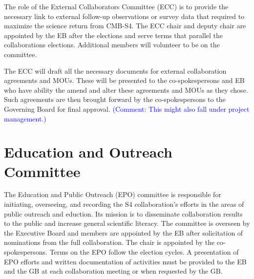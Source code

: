 \documentclass[12pt]{article}
\newcommand{\Comment}[1]{\textcolor{Blue}{(Comment: #1)}}
\begin{document}
The role of the External Collaborators Committee (ECC) is to provide the necessary link to external follow-up observations or survey data that required to maximize the science return from CMB-S4. The ECC chair and deputy chair are appointed by the EB after the elections and serve terms that parallel the collaborations elections. Additional members will volunteer to be on the committee.

The ECC will draft all the necessary documents for external collaboration agreements and MOUs. These will be presented to the co-spokespersons and EB who have ability the amend and alter these agreements and MOUs as they chose. Such agreements are then brought forward by the co-spokespersons to the Governing Board for final approval. \Comment{This might also fall under project management.}

\section{Education and Outreach Committee}

The Education and Public Outreach (EPO) committee is responsible for initiating, overseeing, and recording the S4 collaboration's efforts in the areas of public outreach and eduction. Its mission is to disseminate collaboration results to the public and increase general scientific literacy. The committee is overseen by the Executive Board and members are appointed by the EB after solicitation of nominations from the full collaboration. The chair is appointed by the co-spokespersons. Terms on the EPO follow the election cycles. A presentation of EPO efforts and written documentation of activities must be provided to the EB and the GB at each collaboration meeting or when requested by the GB. 

\end{document}
